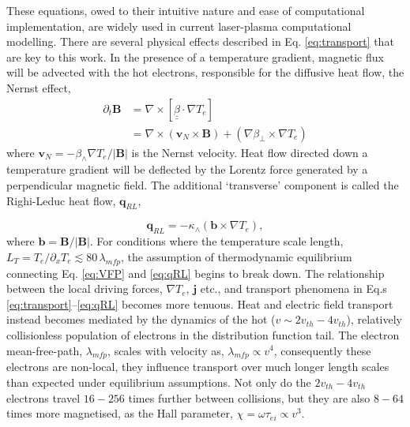 \documentclass[aip,reprint]{revtex4-1}
\begin{document}
These equations, owed to their intuitive nature and ease of computational implementation, are widely used in current laser-plasma computational modelling. There are several physical effects described in Eq. \ref{eq:transport} that are key to this work. In the presence of a temperature gradient, magnetic flux will be advected with the hot electrons, responsible for the diffusive heat flow, the Nernst effect,
\begin{eqnarray}
\partial_t \mathbf{B} &= \nabla \times \left[\underline{\underline{\beta}} \cdot \nabla T_e \right] \\
&=\nabla \times (\mathbf{v}_N \times \mathbf{B})  +  \left(  \nabla \beta_{\perp} \times \nabla T_e\right )
\label{eq:Nernst}
\end{eqnarray}
where $\mathbf{v}_N = - \beta_{\wedge} \nabla T_e/|\mathbf{B}|$ is the Nernst velocity.
 Heat flow directed down a temperature gradient will be deflected by the Lorentz force generated by a perpendicular magnetic field. The additional `transverse' component is called the Righi-Leduc heat flow, $\mathbf{q}_{RL}$,
 
\begin{equation}
\mathbf{q}_{RL}  =-\kappa_{\wedge}(\mathbf{b}\times \nabla T_e), 
\label{eq:qRL}
\end{equation}
where $\mathbf{b} = \mathbf{B}/|\mathbf{B}|$. For conditions where the temperature scale length, $L_{T} = T_e/\partial_x T_e \lesssim 80 \, \lambda_{mfp}$, the assumption of thermodynamic equilibrium connecting Eq. \ref{eq:VFP} and \ref{eq:qRL} begins to break down.  The relationship between the local driving forces, $\nabla T_e$, $\mathbf{j}$  etc., and transport phenomena in Eq.s \ref{eq:transport}--\ref{eq:qRL} becomes more tenuous.  Heat and electric field transport instead becomes mediated by the dynamics of the hot ($v\sim 2\si{v_{th}} - 4\si{v_{th}}$), relatively collisionless population of electrons in the distribution function tail. The electron mean-free-path, $\lambda_{mfp}$, scales with velocity as, $\lambda_{mfp} \propto v^4$, consequently these electrons are non-local, they influence transport over much longer length scales than expected under equilibrium assumptions. Not only do the $2\si{v_{th}} - 4\si{v_{th}}$ electrons travel $16-256$ times further between collisions, but they are also $8-64$ times more magnetised, as the Hall parameter, $\chi = \omega \tau_{ei}\propto v^3$.  
 
\end{document}
